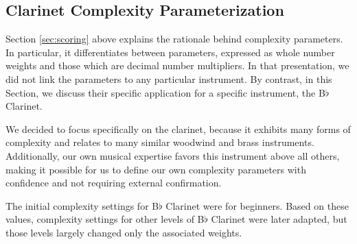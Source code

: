 \documentclass[10pt,preprint]{sigplanconf}
\begin{document}

\subsection{Clarinet Complexity Parameterization} 
\label{sec:settings}

Section \ref{sec:scoring} above explains the rationale behind complexity parameters. In particular, it differentiates between parameters, expressed as whole number weights and those which are decimal number multipliers. In that presentation, we did not link the parameters to any particular instrument. By contrast, in this Section, we discuss their specific application for a specific instrument, the B$\flat$ Clarinet.

We decided to focus specifically on the clarinet, because it exhibits many forms of complexity and relates to many similar woodwind and brass instruments. Additionally, our own musical expertise favors this instrument above all others, making it possible for us to define our own complexity parameters with confidence and not requiring external confirmation. 

The initial complexity settings for B$\flat$ Clarinet were for beginners. Based on these values, complexity settings for other levels of B$\flat$ Clarinet were later adapted, but those levels largely changed only the associated weights. 
\end{document}
